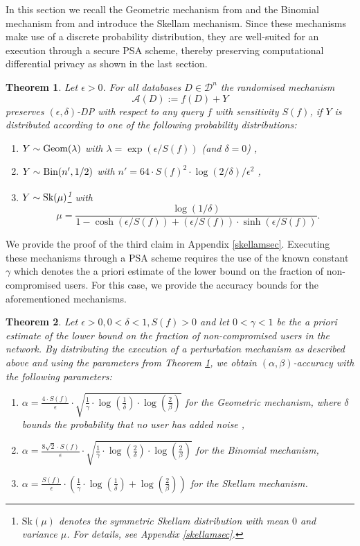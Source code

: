\documentclass[10pt]{extarticle}
\newtheorem{Thm}{Theorem}
\begin{document}
In this section we recall the Geometric mechanism from \cite{2} and the Binomial mechanism from \cite{14} and introduce the Skellam mechanism. Since these mechanisms make use of a discrete probability distribution, they are well-suited for an execution through a secure PSA scheme, thereby preserving computational differential privacy as shown in the last section.

\begin{Thm}\label{privthm} Let $\epsilon>0$. For all databases $D\in\mathcal{D}^n$ the randomised mechanism \[\mathcal{A}(D):=f(D)+Y\]
preserves $(\epsilon,\delta)$-\mbox{\upshape\sffamily DP} with respect to any query $f$ with sensitivity $S(f)$, if $Y$ is distributed according to one of the following probability distributions:
\begin{enumerate}
\item $Y\sim\text{\upshape Geom}(\lambda)$ with $\lambda=\exp(\epsilon/S(f))$ (and $\delta=0$) ,
\item $Y\sim \text{\upshape Bin}(n',1/2)$ with $n'=64\cdot S(f)^2\cdot\log(2/\delta)/\epsilon^2$ ,
\item $Y\sim\text{\upshape Sk}(\mu)$\footnote{$\text{Sk}(\mu)$ denotes the symmetric Skellam distribution with mean $0$ and variance $\mu$. For details, see Appendix \ref{skellamsec}.} with 
\[\mu=\frac{\log(1/\delta)}{1-\cosh(\epsilon/S(f))+(\epsilon/S(f))\cdot\sinh(\epsilon/S(f))}.\]
\end{enumerate}
\end{Thm}

We provide the proof of the third claim in Appendix \ref{skellamsec}. Executing these mechanisms through a PSA scheme requires the use of the known constant $\gamma$ which denotes the a priori estimate of the lower bound on the fraction of non-compromised users. For this case, we provide the accuracy bounds for the aforementioned mechanisms.

\begin{Thm}\label{errorthm} Let $\epsilon>0, 0<\delta<1, S(f)>0$ and let $0<\gamma<1$ be the a priori estimate of the lower bound on the fraction of non-compromised users in the network. By distributing the execution of a perturbation mechanism as described above and using the parameters from Theorem \ref{privthm}, we obtain $(\alpha,\beta)$-accuracy with the following parameters:
\begin{enumerate}
\item $\alpha=\frac{4\cdot S(f)}{\epsilon}\cdot\sqrt{\frac{1}{\gamma}\cdot\log\left(\frac{1}{\delta}\right)\cdot\log\left(\frac{2}{\beta}\right)}$ for the Geometric mechanism, where $\delta$ bounds the probability that no user has added noise ,
\item $\alpha=\frac{8\sqrt{2}\cdot S(f)}{\epsilon}\cdot\sqrt{\frac{1}{\gamma}\cdot\log\left(\frac{2}{\delta}\right)\cdot\log\left(\frac{2}{\beta}\right)}$ for the Binomial mechanism,
\item $\alpha=\frac{S(f)}{\epsilon}\cdot\left(\frac{1}{\gamma}\cdot\log\left(\frac{1}{\delta}\right)+\log\left(\frac{2}{\beta}\right)\right)$ for the Skellam mechanism.
\end{enumerate}
\end{Thm}
\end{document}
